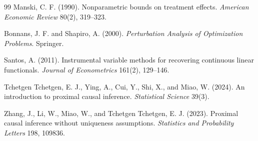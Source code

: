\documentclass[11pt]{article}
\theoremstyle{definition}
\theoremstyle{plain}
\theoremstyle{remark}
\begin{document}
\begin{thebibliography}{99}
Manski, C. F. (1990).
Nonparametric bounds on treatment effects.
\textit{American Economic Review} 80(2), 319--323.

Bonnans, J. F. and Shapiro, A. (2000).
\textit{Perturbation Analysis of Optimization Problems}.
Springer.

Santos, A. (2011).
Instrumental variable methods for recovering continuous linear functionals.
\textit{Journal of Econometrics} 161(2), 129--146.

Tchetgen Tchetgen, E. J., Ying, A., Cui, Y., Shi, X., and Miao, W. (2024).
An introduction to proximal causal inference.
\textit{Statistical Science} 39(3).

Zhang, J., Li, W., Miao, W., and Tchetgen Tchetgen, E. J. (2023).
Proximal causal inference without uniqueness assumptions.
\textit{Statistics and Probability Letters} 198, 109836.
\end{thebibliography}
\end{document}
